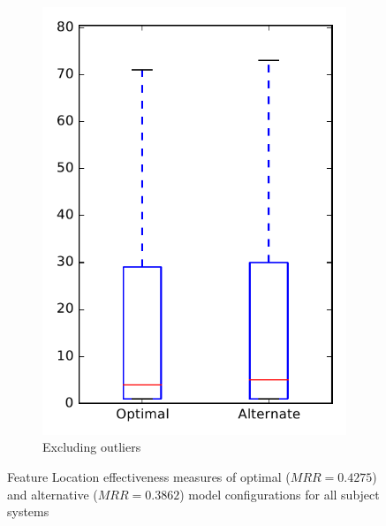 \begin{figure}
\begin{subfigure}{.4\textwidth}
        \includegraphics[height=0.4\textheight]{figures/combo/flt_rq1_all_no_outlier}
        \caption{Excluding outliers}\label{fig:combo:flt:rq1:all_no_outlier}
    \end{subfigure}
\caption{Feature Location effectiveness measures of optimal ($MRR=0.4275$) and alternative ($MRR=0.3862$) model configurations for all subject systems}
\label{fig:combo:flt:rq1:all}
\end{figure}
